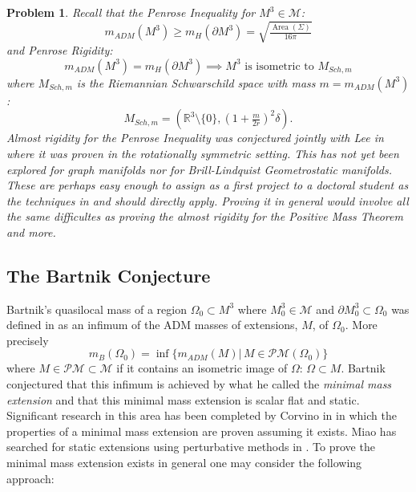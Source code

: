 \documentclass[12pt]{amsart}
\newtheorem{problem}[thm]{Problem}
\begin{document}
\begin{problem}
Recall that the Penrose
Inequality for $M^3\in \mathcal{M}$: 
\begin{equation}
m_{ADM}(M^3)\ge m_H(\partial M^3) = \sqrt{\tfrac{{\operatorname{Area}}(\Sigma)}{16\pi}}
\end{equation}
and Penrose Rigidity:
\begin{equation}
m_{ADM}(M^3)= m_H(\partial M^3) \implies M^3 \textrm{ is isometric to }M_{Sch,m}
\end{equation}
where $M_{Sch,m}$ is the Riemannian Schwarschild space with
mass $m=m_{ADM}(M^3)$:
\begin{equation}
M_{Sch,m}=\left({\mathbb{R}}^3\setminus \{0\}, (1+ \tfrac{m}{2r})^2 \delta\right).
\end{equation}
Almost rigidity for the Penrose Inequality was conjectured jointly with
Lee in \cite{LeeSormani2}  where it was proven
in the rotationally symmetric setting.   This has not yet been explored for
graph manifolds nor for Brill-Lindquist Geometrostatic manifolds.   These 
are perhaps easy enough to assign as a first project to a doctoral student
as the techniques in \cite{HLS} and \cite{Sormani-Stavrov-1} should directly
apply.  Proving it in general would involve all the same difficultes
as proving the almost rigidity for the Positive Mass Theorem and more.
\end{problem}

\subsection{The Bartnik Conjecture}

Bartnik's quasilocal mass of a region $\Omega_0 \subset M^3$
where $M_0^3\in \mathcal{M}$ and $\partial M_0^3 \subset \Omega_0$
was defined in \cite{Bartnik-1986} as an infimum of
the ADM masses of extensions, $M$, of $\Omega_0$.  More precisely
\begin{equation}
m_B(\Omega_0)=\inf\{m_{ADM}(M)|\, M \in\mathcal{PM}(\Omega_0) \}
\end{equation}
where $M\in \mathcal{PM}\subset \mathcal{M}$ if it contains an isometric image
of $\Omega$: $\Omega \subset M$.   Bartnik conjectured that this
infimum is achieved by what he called the {\em minimal mass extension}
and that this minimal mass extension is scalar flat and static.   
Significant
research in this area has been completed by 
Corvino in \cite{Corvino-CMP}
in which the properties of a minimal mass extension are proven assuming it
exists.  Miao has searched for static extensions using perturbative methods
in \cite{Miao-CMP}.
To prove the minimal mass extension exists in general one may consider the
following approach:
\end{document}
